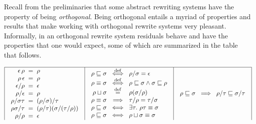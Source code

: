 
Recall from the preliminaries that some abstract rewriting systems have the property of being
\emph{orthogonal}.
Being orthogonal entails a myriad of properties and results that make working
with orthogonal rewrite systems very pleasant.
Informally, in an orthogonal rewrite system residuals behave and have the properties
that one would expect, some of which are summarized in the table that follows.

{\footnotesize
\[
\begin{array}{|c|c|c|}
\hline
\begin{array}{r@{\hspace{0.2cm}}c@{\hspace{0.2cm}}l}
  \emptyDerivation\,\redseq & = & \redseq
\\
  \redseq\,\emptyDerivation & = & \redseq
\\
  \emptyDerivation/\redseq & = & \emptyDerivation
\\
  \redseq/\emptyDerivation & = & \redseq
\\
  \redseq/\redseqtwo\redseqthree & = & (\redseq/\redseqtwo)/\redseqthree
\\
  \redseq\redseqtwo/\redseqthree & = & (\redseq/\redseqthree)(\redseqtwo/(\redseqthree/\redseq))
\\
  \redseq/\redseq & = & \emptyDerivation
\end{array}
&
\begin{array}{r@{\hspace{0.2cm}}c@{\hspace{0.2cm}}l}
  \redseq \permle \redseqtwo & \iffdef & \redseq/\redseqtwo = \emptyDerivation
\\
  \redseq \permeq \redseqtwo & \iffdef & \redseq \permle \redseqtwo \land \redseqtwo \permle \redseq
\\
  \redseq \sqcup \redseqtwo  & \eqdef & \redseq(\redseqtwo/\redseq) 
\\
  \redseq \permeq \redseqtwo & \implies & \redseqthree/\redseq = \redseqthree/\redseqtwo
\\
  \redseq \permle \redseqtwo & \iff & \exists \redseqthree.\ \redseq\redseqthree \permeq \redseqtwo
\\
  \redseq \permle \redseqtwo & \iff & \redseq \sqcup \redseqtwo \permeq \redseqtwo
\end{array}
&
\begin{array}{r@{\hspace{0.2cm}}c@{\hspace{0.2cm}}l}
  \redseq \permle \redseqtwo & \implies & \redseq/\redseqthree \permle \redseqtwo/\redseqthree

\end{array}
\end{array}\]}
